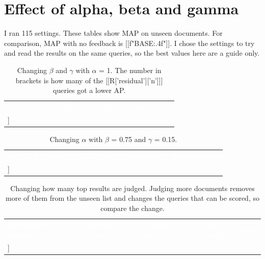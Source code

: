 \section{Effect of alpha, beta and gamma}
I ran 115 settings. These tables show MAP on unseen documents. For comparison, MAP with no feedback is [[f"{BASE:.4f}"]]. I chose the settings to try and read the results on the same queries, so the best values here are a guide only.
\begin{table}[H]\small\centering\caption{Changing $\beta$ and $\gamma$ with $\alpha$ = 1. The number in brackets is how many of the [[R['residual']['n']]] queries got a lower AP.}
\begin{tabular}{lrrrrr}\rowcolor{navy} & \textcolor{white}{\textbf{$\gamma$ = 0}} & \textcolor{white}{\textbf{$\gamma$ = 0.15}} & \textcolor{white}{\textbf{$\gamma$ = 0.25}} & \textcolor{white}{\textbf{$\gamma$ = 0.5}} & \textcolor{white}{\textbf{$\gamma$ = 1}} \\
[[t_grid()]]
\hline\end{tabular}\end{table}
\begin{table}[H]\small\centering\caption{Changing $\alpha$ with $\beta$ = 0.75 and $\gamma$ = 0.15.}
\begin{tabular}{lrrrr}\rowcolor{navy}\textcolor{white}{\textbf{$\alpha$}} & \textcolor{white}{\textbf{MAP (unseen)}} & \textcolor{white}{\textbf{MAP (all)}} & \textcolor{white}{\textbf{Queries up}} & \textcolor{white}{\textbf{Queries down}} \\
[[t_alpha()]]
\hline\end{tabular}\end{table}
\begin{table}[H]\small\centering\caption{Changing how many top results are judged. Judging more documents removes more of them from the unseen list and changes the queries that can be scored, so compare the change.}
\begin{tabular}{lrrrr}\rowcolor{navy}\textcolor{white}{\textbf{Documents judged}} & \textcolor{white}{\textbf{Queries scored}} & \textcolor{white}{\textbf{Before (unseen)}} & \textcolor{white}{\textbf{After (unseen)}} & \textcolor{white}{\textbf{Change}} \\
[[t_k()]]
\hline\end{tabular}\end{table}

